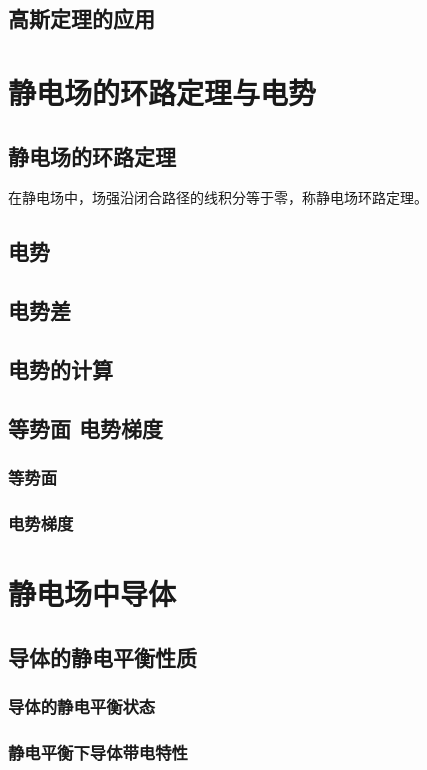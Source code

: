     \subsection{高斯定理的应用}

\section{静电场的环路定理与电势}
    \subsection{静电场的环路定理}
    在静电场中，场强沿闭合路径的线积分等于零，称静电场环路定理。
    \subsection{电势}
    \subsection{电势差}
    \subsection{电势的计算}
    \subsection{等势面 电势梯度}
        \subsubsection{等势面}
        \subsubsection{电势梯度}

\section{静电场中导体}
    \subsection{导体的静电平衡性质}
        \subsubsection{导体的静电平衡状态}
        \subsubsection{静电平衡下导体带电特性}
